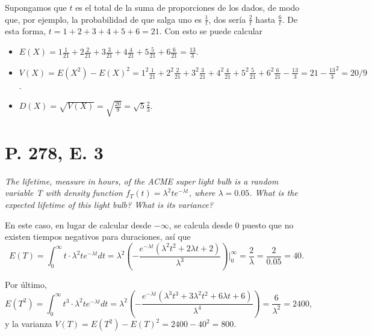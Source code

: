 \documentclass[paper=leter, fontsize=11pt]{scrartcl}
\numberwithin{equation}{section}		%
\numberwithin{figure}{section}			%
\numberwithin{table}{section}				%
\begin{document}
Supongamos que $t$ es el total de la suma de proporciones de los dados, de modo que, por ejemplo, la probabilidad de que salga uno es $\frac{1}{t}$, dos sería $\frac{2}{t}$ hasta $\frac{6}{t}$. De esta forma, $t = 1 + 2 + 3 + 4 + 5 + 6 = 21$. Con esto se puede calcular
\begin{itemize}
    \item $E(X) = 1 \frac{1}{21} + 2 \frac{2}{21} + 3 \frac{3}{21} + 4 \frac{4}{21} + 5 \frac{5}{21} + 6 \frac{6}{21} = \frac{13}{3}$.
    \item $V(X) = E(X^2) - E(X)^2 = 1^2 \frac{1}{21} + 2^2 \frac{2}{21} + 3^2 \frac{3}{21} + 4^2 \frac{4}{21} + 5^2 \frac{5}{21} + 6^2 \frac{6}{21} - \frac{13}{3} = 21 - \frac{13}{3}^2 = 20 / 9$.
    \item $D(X) = \sqrt{V(X)} = \sqrt{\frac{20}{9}} = \sqrt{5}\frac{2}{3}$.
\end{itemize}


\section*{P. 278, E. 3}
\emph{The lifetime, measure in hours, of the ACME super light bulb is a random variable T with density function \(f_T (t) = \lambda^2 te^{- \lambda t}\), where \(\lambda = 0.05\). What is the expected lifetime of this light bulb? What is its variance?}

En este caso, en lugar de calcular desde $-\infty$, se calcula desde $0$ puesto que no existen tiempos negativos para duraciones, así que
\begin{dmath*}
    E(T) = \int^{\infty}_{0}t\cdot \lambda^{2}te^{-\lambda t}dt = \lambda^{2}\left (- \frac{e^{-\lambda t}(\lambda^{2}t^{2} + 2\lambda t + 2)}{\lambda^{3}} \right )|^{\infty}_{0} 
         = {\frac{2}{\lambda} = \frac{2}{0.05} = 40}.
\end{dmath*}

Por último,
\begin{dmath*}
    E(T^2) = \int^{\infty}_{0}t^{3}\cdot \lambda^{2}te^{-\lambda t}dt = \lambda^{2} \left (- \frac{e^{-\lambda t}(\lambda^{3}t^{3} + 3\lambda^{2}t^{2} + 6\lambda t + 6)}{\lambda^{4}} \right ) = \frac{6}{\lambda^{2}} = 2400,
\end{dmath*}
y la varianza $V(T) = E(T^2) - E(T)^2 = 2400 - 40^2 = 800$.
\end{document}
